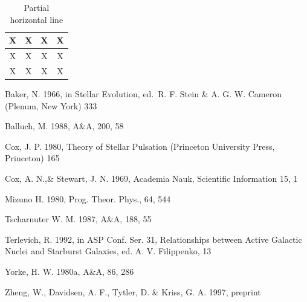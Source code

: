 \documentclass[a4paper,10pt]{article}
\begin{document}
\begin{table}[ht]

\caption{Partial horizontal line}

\begin{center}

\begin{tabular}{ || c || c || c || c ||}

\hline \hline


\rowcolor {red! 50} X&X&X&X\\
\hline \hline
\rowcolor {green! 70} X&X&X&X\\
\hline \hline
\rowcolor {blue! 10} X&X&X&X \\
\hline \hline

\end{tabular}

\end{center}

\label{tab:multicol}

\end{table}

\begin{thebibliography}{}

   Baker, N. 1966,
      in Stellar Evolution,
      ed.\ R. F. Stein \& A. G. W. Cameron
      (Plenum, New York) 333

    Balluch, M. 1988,
      A\&A, 200, 58

    Cox, J. P. 1980,
      Theory of Stellar Pulsation
      (Princeton University Press, Princeton) 165

    Cox, A. N.,\& Stewart, J. N. 1969,
      Academia Nauk, Scientific Information 15, 1

    Mizuno H. 1980,
      Prog. Theor. Phys., 64, 544
   
    Tscharnuter W. M. 1987,
      A\&A, 188, 55
  
    Terlevich, R. 1992, in ASP Conf. Ser. 31, 
      Relationships between Active Galactic Nuclei and Starburst Galaxies, 
      ed. A. V. Filippenko, 13

    Yorke, H. W. 1980a,
      A\&A, 86, 286

    Zheng, W., Davidsen, A. F., Tytler, D. \& Kriss, G. A.
      1997, preprint
\end{thebibliography}
\end{document}
